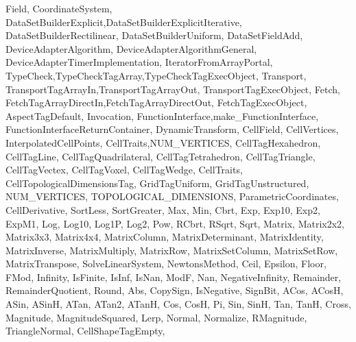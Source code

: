 {{                   Field,
                   CoordinateSystem,
                   DataSetBuilderExplicit,DataSetBuilderExplicitIterative,
                   DataSetBuilderRectilinear,
                   DataSetBuilderUniform,
                   DataSetFieldAdd,
                   DeviceAdapterAlgorithm, DeviceAdapterAlgorithmGeneral,
                   DeviceAdapterTimerImplementation,
                   IteratorFromArrayPortal,
                   TypeCheck,TypeCheckTagArray,TypeCheckTagExecObject,
                   Transport,
                   TransportTagArrayIn,TransportTagArrayOut,
                   TransportTagExecObject,
                   Fetch,
                   FetchTagArrayDirectIn,FetchTagArrayDirectOut,
                   FetchTagExecObject,
                   AspectTagDefault,
                   Invocation,
                   FunctionInterface,make_FunctionInterface,
                   FunctionInterfaceReturnContainer,
                   DynamicTransform,
                   CellField, CellVertices,
                   InterpolatedCellPoints,
                   CellTraits,NUM_VERTICES,
                   CellTagHexahedron, CellTagLine, CellTagQuadrilateral,
                   CellTagTetrahedron, CellTagTriangle, CellTagVectex,
                   CellTagVoxel, CellTagWedge,
                   CellTraits,
                   CellTopologicalDimensionsTag,
                   GridTagUniform, GridTagUnstructured,
                   NUM_VERTICES, TOPOLOGICAL_DIMENSIONS,
                   ParametricCoordinates, CellDerivative,
                   SortLess, SortGreater,
                   Max, Min,
                   Cbrt, Exp, Exp10, Exp2, ExpM1, Log, Log10, Log1P, Log2,
                   Pow, RCbrt, RSqrt, Sqrt,
                   Matrix, Matrix2x2, Matrix3x3, Matrix4x4,
                   MatrixColumn, MatrixDeterminant, MatrixIdentity,
                   MatrixInverse, MatrixMultiply, MatrixRow,
                   MatrixSetColumn, MatrixSetRow, MatrixTranspose,
                   SolveLinearSystem,
                   NewtonsMethod,
                   Ceil, Epsilon, Floor, FMod, Infinity, IsFinite, IsInf,
                   IsNan, ModF, Nan, NegativeInfinity, Remainder,
                   RemainderQuotient, Round,
                   Abs, CopySign, IsNegative, SignBit,
                   ACos, ACosH, ASin, ASinH, ATan, ATan2, ATanH, Cos, CosH,
                   Pi, Sin, SinH, Tan, TanH,
                   Cross, Magnitude, MagnitudeSquared, Lerp, Normal,
                   Normalize, RMagnitude, TriangleNormal,
                   CellShapeTagEmpty,
}}
